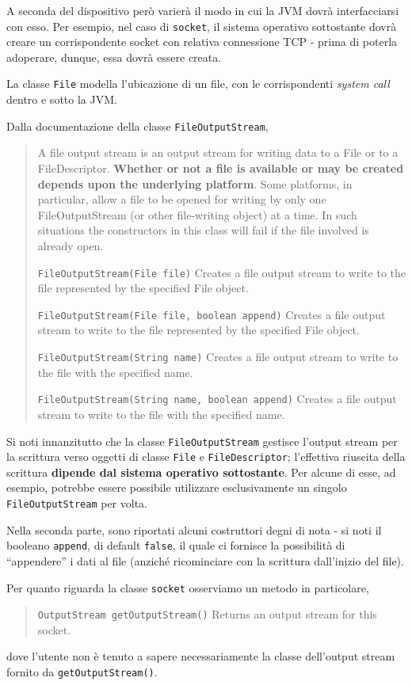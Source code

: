 \documentclass[\fontsizeclass,twocolumn]{\classname}
\theoremstyle{definition}
\theoremstyle{definition}
\begin{document}
A seconda del dispositivo però varierà il modo in cui la JVM dovrà
interfacciarsi con esso. Per esempio, nel caso di \texttt{socket},
il sistema operativo sottostante dovrà creare un corrispondente socket
con relativa connessione TCP \-- prima di poterla adoperare, dunque, essa dovrà
essere creata.

La classe \texttt{File} modella l'ubicazione di un file, con le corrispondenti
\emph{system call} dentro e sotto la JVM.

Dalla documentazione della classe \texttt{FileOutputStream},
\begin{quote}
    \footnotesize{A file output stream is an output stream for writing data to
    a File or to a FileDescriptor. \textbf{Whether or not a file is available or may be
    created depends upon the underlying platform}. Some platforms, in particular,
allow a file to be opened for writing by only one FileOutputStream (or other
file-writing object) at a time. In such situations the constructors in this
class will fail if the file involved is already open.

\texttt{FileOutputStream(File file)} 	Creates a file output stream to write to the file represented by the specified File object.

\texttt{FileOutputStream(File file, boolean append)} 	Creates a file output stream to write to the file represented by the specified File object.

\texttt{FileOutputStream(String name)} 	Creates a file output stream to write to the file with the specified name.

\texttt{FileOutputStream(String name, boolean append)} 	Creates a file output stream to write to the file with the specified name.
}
\end{quote}

Si noti innanzitutto che la classe \texttt{FileOutputStream} gestisce l'output
stream per la scrittura verso oggetti di classe \texttt{File} e
\texttt{FileDescriptor}; l'effettiva riuscita della scrittura \textbf{dipende
dal sistema operativo sottostante}. Per alcune di esse, ad esempio, potrebbe
essere possibile utilizzare esclusivamente un singolo \texttt{FileOutputStream}
per volta.

Nella seconda parte, sono riportati alcuni costruttori degni di nota \-- si
noti il booleano \texttt{append}, di default \texttt{false}, il quale ci
fornisce la possibilità di ``appendere'' i dati al file (anziché ricominciare
con la scrittura dall'inizio del file).

Per quanto riguarda la classe \texttt{socket} osserviamo un metodo in
particolare,
\begin{quote}
    \footnotesize{\texttt{OutputStream 	getOutputStream()}	Returns an output
    stream for this socket.}
\end{quote}
dove l'utente non è tenuto a sapere necessariamente la classe dell'output
stream fornito da \texttt{getOutputStream()}.
\end{document}
